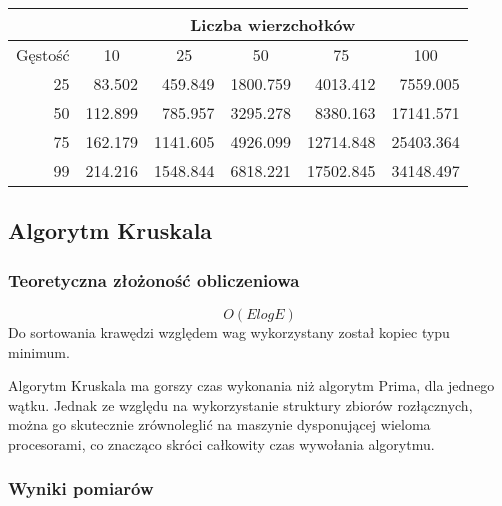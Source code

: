 \documentclass[12pt]{article}
\begin{document}
\begin{center}
\begin{tabular}{|r|r|r|r|r|r|}
\hline
                              & \multicolumn{5}{c|}{Liczba wierzchołków}                                                                                         \\ \hline
\multicolumn{1}{|c|}{Gęstość} & \multicolumn{1}{c|}{10} & \multicolumn{1}{c|}{25} & \multicolumn{1}{c|}{50} & \multicolumn{1}{c|}{75} & \multicolumn{1}{c|}{100} \\ \hline
25                            & 83.502                  & 459.849                 & 1800.759                & 4013.412                & 7559.005                 \\ \hline
50                            & 112.899                 & 785.957                 & 3295.278                & 8380.163                & 17141.571                \\ \hline
75                            & 162.179                 & 1141.605                & 4926.099                & 12714.848               & 25403.364                \\ \hline
99                            & 214.216                 & 1548.844                & 6818.221                & 17502.845               & 34148.497                \\ \hline
\end{tabular}
\end{center}



\subsection{Algorytm Kruskala}
\subsubsection{Teoretyczna złożoność obliczeniowa}
{\Large\[ O(E log E) \]}
Do sortowania krawędzi względem wag wykorzystany został kopiec typu minimum.

Algorytm Kruskala ma gorszy czas wykonania niż algorytm Prima, dla jednego wątku. Jednak ze względu na wykorzystanie struktury zbiorów rozłącznych, można go skutecznie zrównoleglić na maszynie dysponującej wieloma procesorami, co znacząco skróci całkowity czas wywołania algorytmu.

\newpage
\subsubsection{Wyniki pomiarów}
\end{document}
